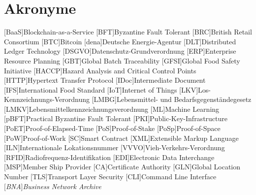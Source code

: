 \section*{Akronyme}            %
\begin{acronym}[HACCP]
	[BaaS]{Blockchain-as-a-Service}
  [BFT]{Byzantine Fault Tolerant}
  [BRC]{British Retail Consortium}
	[BTC]{Bitcoin}
	[dena]{Deutsche Energie-Agentur}
	[DLT]{Distributed Ledger Technology}
  [DSGVO]{Datenschutz-Grundverordnung}
  [ERP]{Enterprise Resource Planning}
  [GBT]{Global Batch Traceability}
  [GFSI]{Global Food Safety Initiative}
  [HACCP]{Hazard Analysis and Critical Control Points}
  [HTTP]{Hypertext Transfer Protocol}
  [IDoc]{Intermediate Document}
  [IFS]{International Food Standard}
	[IoT]{Internet of Things}
  [LKV]{Los-Kennzeichnungs-Verordnung}
  [LMBG]{Lebensmittel- und Bedarfsgegenständegesetz}
  [LMKV]{Lebensmittelkennzeichnungsverordnung}
	[ML]{Machine Learning}
  [pBFT]{Practical Byzantine Fault Tolerant}
  [PKI]{Public-Key-Infrastructure}
  [PoET]{Proof-of-Elapsed-Time}
  [PoS]{Proof-of-Stake}
  [PoSp]{Proof-of-Space}
	[PoW]{Proof-of-Work}
	[SC]{Smart Contract}
  [XML]{Extensible Markup Language}
  [ILN]{Internationale Lokationsnummer}
  [VVVO]{Vieh-Verkehrs-Verordnung}
  [RFID]{Radiofrequenz-Identifikation}
  [EDI]{Electronic Data Interchange}
  [MSP]{Member Ship Provider}
  [CA]{Certificate Authority}
  [GLN]{Global Location Number}
  [TLS]{Transport Layer Security}
  [CLI]{Command Line Interface}
  [\textit{BNA}]{\textit{Business Network Archive}}
\end{acronym}

\newpage

\listoffigures
{}
\listoftables
{}
\lstlistoflistings
{}
\newpage
